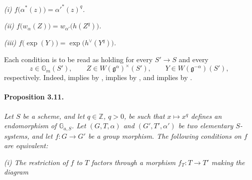 \smallskip
\noindent\emph{\textup{(i)}
\(f\bigl(\alpha^\ast(z)\bigr)=\alpha'^\ast(z)^q\).}

\smallskip
\noindent\emph{\textup{(ii)}
\(f\bigl(w_\alpha(Z)\bigr)=w_{\alpha'}\bigl(h(Z^q)\bigr)\).}

\smallskip
\noindent\emph{\textup{(iii)}
\(f\bigl(\exp(Y)\bigr)=\exp\bigl(h^\vee(Y^q)\bigr)\).}

\smallskip
Each condition is to be read as holding for every \(S'\to S\) and
every
\[
  z\in\mathbb G_m(S'),\qquad
  Z\in W(\mathfrak g^\alpha)^\times(S'),\qquad
  Y\in W(\mathfrak g^{-\alpha})(S'),
\]
respectively.  Indeed, \textup{} implies \textup{} by ,
\textup{} implies \textup{} by , and \textup{}
implies \textup{} by .

\paragraph{\textbf{Proposition 3.11.}}
\emph{Let \(S\) be a scheme, and let \(q\in\mathbb Z\), \(q>0\), be
such that \(x\mapsto x^q\) defines an endomorphism of
\(\mathbb G_{a,S}\).  Let \((G,T,\alpha)\) and
\((G',T',\alpha')\) be two elementary \(S\)-systems, and let
\(f\colon G\to G'\) be a group morphism.  The following
conditions on \(f\) are equivalent:}

\smallskip
\noindent\emph{\textup{(i)} The restriction of \(f\) to \(T\)
factors through a morphism \(f_T\colon T\to T'\) making the diagram}

\begin{center}
\end{center}


